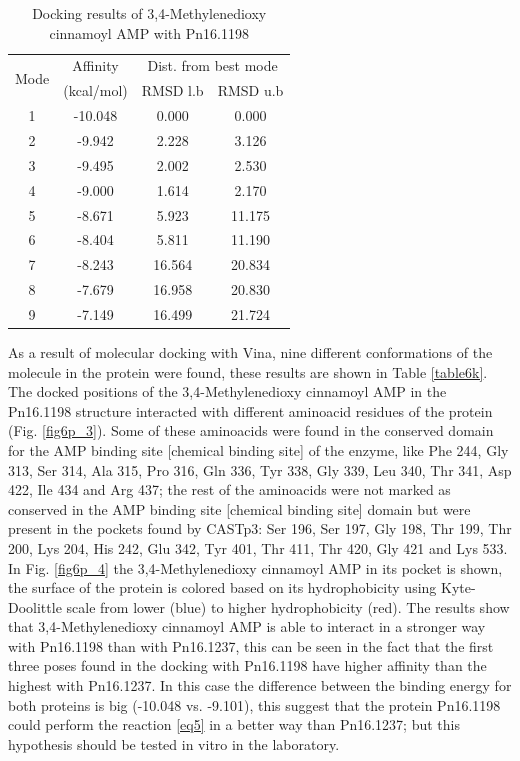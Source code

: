 \documentclass[12pt]{article}
\begin{document}
	\newpage
	
	\begin{table}
		\centering
		\caption{\centering Docking results of 3,4-Methylenedioxy cinnamoyl AMP with Pn16.1198}
		\label{table6p}
		\begin{tabular}{cccc}
			\toprule
			\multirow{2}{*}{Mode} & Affinity & \multicolumn{2}{c}{Dist. from best mode}\\
			&  (kcal/mol) & RMSD l.b & RMSD u.b\\
			\midrule
			1 & -10.048  &    0.000  &    0.000\\
			2 & -9.942   &   2.228   &   3.126\\
			3 & -9.495   &   2.002   &   2.530\\
			4 & -9.000   &   1.614   &   2.170\\
			5 & -8.671   &   5.923   &  11.175\\
			6 & -8.404   &   5.811   &  11.190\\
			7 & -8.243   &  16.564   &  20.834\\
			8 & -7.679   &  16.958   &  20.830\\
			9 & -7.149   &  16.499   &  21.724\\
			\bottomrule
			
		\end{tabular}
	\end{table}
	
	As a result of molecular docking with Vina, nine different conformations of the molecule in the protein were found, these results are shown in Table \ref{table6k}. The docked positions of the 3,4-Methylenedioxy cinnamoyl AMP in the Pn16.1198 structure interacted with different aminoacid residues of the protein (Fig. \ref{fig6p_3}). Some of these aminoacids were found in the conserved domain for the AMP binding site [chemical binding site] of the enzyme, like Phe 244, Gly 313, Ser 314, Ala 315, Pro 316, Gln 336, Tyr 338, Gly 339, Leu 340, Thr 341, Asp 422, Ile 434 and Arg 437; the rest of the aminoacids were not marked as conserved in the AMP binding site [chemical binding site] domain but were present in the pockets found by CASTp3: Ser 196, Ser 197, Gly 198, Thr 199, Thr 200, Lys 204, His 242, Glu 342, Tyr 401, Thr 411, Thr 420, Gly 421 and Lys 533. In Fig. \ref{fig6p_4} the 3,4-Methylenedioxy cinnamoyl AMP in its pocket is shown, the surface of the protein is colored based on its hydrophobicity using Kyte-Doolittle scale from lower (blue) to higher hydrophobicity (red). The results show that 3,4-Methylenedioxy cinnamoyl AMP is able to interact in a stronger way with Pn16.1198 than with Pn16.1237, this can be seen in the fact that the first three poses found in the docking with Pn16.1198 have higher affinity than the highest with Pn16.1237. In this case the difference between the binding energy for both proteins is big (-10.048 vs. -9.101), this suggest that the protein Pn16.1198 could perform the reaction \ref{eq5} in a better way than Pn16.1237; but this hypothesis should be tested in vitro in the laboratory.
	
\end{document}
